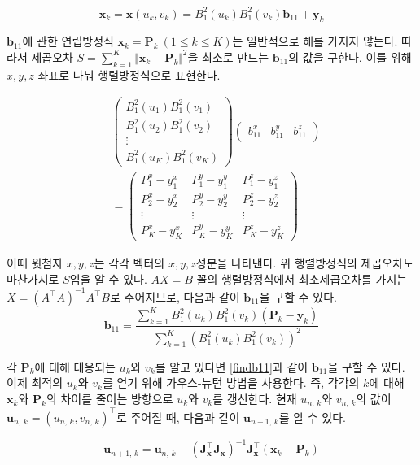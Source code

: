 \documentclass{Humantech_Paper_Awardfullpaper_hutech}
\begin{document}
$$ \mathbf{x}_k = \mathbf{x}(u_k, v_k) = B_1^2(u_k) B_1^2(v_k) \mathbf{b}_{11} + \mathbf{y}_k $$ 

$\mathbf{b}_{11}$에 관한 연립방정식 $\mathbf{x}_k = \mathbf{P}_k \ (1 \leq k \leq K)$는 일반적으로 해를 가지지 않는다. 따라서 제곱오차 $S = \sum_{k=1}^K \Vert \mathbf{x}_k - \mathbf{P}_k \Vert^2$을 최소로 만드는 $\mathbf{b}_{11}$의 값을 구한다. 이를 위해 $x, y, z$ 좌표로 나눠 행렬방정식으로 표현한다. 

\begin{align*}
	&\begin{pmatrix}
		B_1^2(u_1)B_1^2(v_1) \\ B_1^2(u_2)B_1^2(v_2) \\ \vdots \\ B_1^2(u_K)B_1^2(v_K)
	\end{pmatrix} \begin{pmatrix}
		b_{11}^x & b_{11}^y & b_{11}^z
	\end{pmatrix} \\
	&= \begin{pmatrix}
		P_1^x-y_1^x & P_1^y-y_1^y & P_1^z-y_1^z \\ P_2^x-y_2^x & P_2^y-y_2^y & P_2^z-y_2^z \\ \vdots & \vdots & \vdots \\ P_K^x-y_K^x & P_K^y-y_K^y & P_K^z-y_K^z
	\end{pmatrix}
\end{align*}

이때 윗첨자 $x, y, z$는 각각 벡터의 $x, y, z$성분을 나타낸다. 위 행렬방정식의 제곱오차도 마찬가지로 $S$임을 알 수 있다. $AX = B$ 꼴의 행렬방정식에서 최소제곱오차를 가지는 $X = (A^\intercal A)^{-1} A^\intercal B$로 주어지므로, 다음과 같이 $\mathbf{b}_{11}$을 구할 수 있다. 
\begin{equation} \label{findb11}
	\mathbf{b}_{11} = \frac{\sum_{k=1}^K B_1^2(u_k) B_1^2 (v_k) (\mathbf{P}_k - \mathbf{y}_k)}{\sum_{k=1}^K (B_1^2(u_k) B_1^2(v_k))^2}
\end{equation}

각 $\mathbf{P}_k$에 대해 대응되는 $u_k$와 $v_k$를 알고 있다면 \eqref{findb11}과 같이 $\mathbf{b}_{11}$을 구할 수 있다. 이제 최적의 $u_k$와 $v_k$를 얻기 위해 가우스-뉴턴 방법을 사용한다. 즉, 각각의 $k$에 대해 $\mathbf{x}_k$와 $\mathbf{P}_k$의 차이를 줄이는 방향으로 $u_k$와 $v_k$를 갱신한다. 현재 $u_{n, \, k}$와 $v_{n, \, k}$의 값이 $\mathbf{u}_{n, \, k} = (u_{n, \, k}, v_{n, \, k})^\intercal$로 주어질 때, 다음과 같이 $\mathbf{u}_{n+1, \, k}$를 알 수 있다. 

\begin{equation} \label{rearrange}
	\mathbf{u}_{n+1, \, k} = \mathbf{u}_{n, \, k} - (\mathbf{J}_\mathbf{x}^\intercal \mathbf{J}_\mathbf{x})^{-1} \mathbf{J}_\mathbf{x}^\intercal (\mathbf{x}_k - \mathbf{P}_k)
\end{equation}
\end{document}
